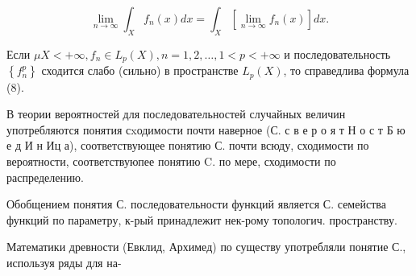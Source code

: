 \documentclass[10pt]{article}
\begin{document}
\[

\lim _{n \rightarrow \infty} \int_{X} f_{n}(x) d x=\int_{X}\left[\lim _{n \rightarrow \infty} f_{n}(x)\right] d x .

\]



Если $\mu X<+\infty, f_{n} \in L_{p}(X), n=1,2, \ldots, 1<p<+\infty$ и последовательность $\left\{f_{n}^{p}\right\}$ сходится слабо (сильно) в пространстве $L_{p}(X)$, то справедлива формула (8).



В теории вероятностей для последовательностей случайных величин употребляются понятия сxодимости почти наверное (С. с в е р о я т Н о с т Б ю е д И н Иц а), соответствующее понятию С. почти всюду, сходимости по вероятности, соответствуюпее понятию $\mathrm{C}$. по мере, сходимости по распределению.



Обобщением понятия С. последовательности функций является С. семейства функций по параметру, к-рый принадлежит нек-рому топологич. пространству.



Математики древности (Евклид, Архимед) по существу употребляли понятие С., используя ряды для на-
\end{document}
